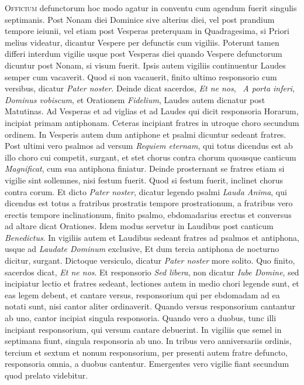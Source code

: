 \begin{multicols*}{2}
{\color{Red} }
\lettrine[lines=2]{\zallmancaps \color{Blue} O}{fficium} defunctorum hoc modo agatur in conventu cum agendum fuerit singulis septimanis. Post Nonam diei Dominice sive alterius diei, vel post prandium tempore ieiunii, vel etiam post Vesperas preterquam in Quadragesima, si Priori melius videatur, dicantur Vespere per defunctis cum vigiliis. Poterunt tamen differi interdum vigilie usque post Vesperas diei quando Vespere defunctorum dicuntur post Nonam, si visum fuerit.
Ipsis autem vigiliis continuentur Laudes semper cum vacaverit.
Quod si non vacauerit, finito ultimo responsorio cum versibus, dicatur \textit{Pater noster}. Deinde dicat sacerdos, \textit{Et ne nos}, \Vbar \ \textit{A porta inferi}, \textit{Dominus vobiscum}, et Orationem \textit{Fidelium}, Laudes autem dicnatur post Matutinas. Ad Vesperas et ad viglias et ad Laudes qui dicit responsoria Horarum, incipiat primam antiphonam. Ceteras incipiant fratres in utroque choro secundum ordinem.
In Vesperis autem dum antiphone et psalmi dicuntur sedeant fratres. Post ultimi vero psalmos ad versum \textit{Requiem eternam}, qui totus dicendus est ab illo choro cui competit, surgant, et stet chorus contra chorum quousque canticum \textit{Magnificat}, cum sua antiphona finiatur.
Deinde prosternant se fratres etiam si vigilie sint sollemnes, nisi festum fuerit. Quod si festum fuerit, inclinet chorus contra corum. Et dicto \textit{Pater noster}, dicatur legendo psalmi \textit{Lauda Anima}, qui dicendus est totus a fratribus prostratis tempore prostrationum, a fratribus vero erectis tempore inclinationum, finito psalmo, ebdomadarius erectus et conversus ad altare dicat Orationes. Idem modus servetur in Laudibus post canticum \textit{Benedictus}.
In vigiliis autem et Laudibus sedeant fratres ad psalmos et antiphona, usque ad \textit{Laudate Dominum} exclusive, Et dum tercia antiphona de nocturno dicitur, surgant. Dictoque versiculo, dicatur \textit{Pater noster} more solito. Quo finito, sacerdos dicat, \textit{Et ne nos}. Et responsorio \textit{Sed libera}, non dicatur \textit{Iube Domine}, sed incipiatur lectio et fratres sedeant, lectiones autem in medio chori legende sunt, et eas legem debent, et cantare versus, responsorium qui per ebdomadam ad ea notati sunt, nisi cantor aliter ordinaverit.
Quando versus responsorium cantantur ab uno, cantor incipiat singula responsoria. Quando vero a duobus, tunc illi incipiant responsorium, qui versum cantare debuerint. In vigiliis que semel in septimana fiunt, singula responsoria ab uno. In tribus vero anniversariis ordinis, tercium et sextum et nonum responsorium, per presenti autem fratre defuncto, responsoria omnia, a duobus cantentur. Emergentes vero vigilie fiant secundum quod prelato videbitur.

\end{multicols*}
